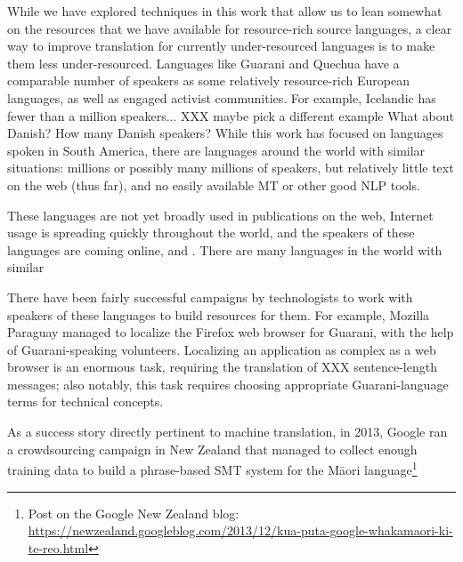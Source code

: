 While we have explored techniques in this work that allow us to lean
somewhat on the resources that we have available for resource-rich source
languages, a clear way to improve translation for currently under-resourced
languages is to make them less under-resourced. Languages like Guarani and
Quechua have a comparable number of speakers as some relatively resource-rich
European languages, as well as engaged activist communities. For example,
Icelandic has fewer than a million speakers... XXX maybe pick a different
example
What about Danish? How many Danish speakers?
While this work has focused on languages spoken in South America, there are
languages around the world with similar situations: millions or possibly many
millions of speakers, but relatively little text on the web (thus far), and no
easily available MT or other good NLP tools.

These languages are not yet broadly used in publications on the web,
Internet usage is spreading quickly throughout the world, and
the speakers of these languages are coming online, and . There are many languages in
the world with similar 

There have been fairly successful campaigns by technologists to work with
speakers of these languages to build resources for them.
For example, Mozilla Paraguay managed to localize the Firefox web browser for
Guarani, with the help of Guarani-speaking volunteers. Localizing an
application as complex as a web browser is an enormous task, requiring the
translation of XXX sentence-length messages; also notably, this task requires
choosing appropriate Guarani-language terms for technical concepts.

As a success story directly pertinent to machine translation, in 2013, Google
ran a crowdsourcing campaign in New Zealand that managed to collect
enough training data to build a phrase-based SMT system for the Māori
language\footnote{Post on the Google New Zealand blog:
\url{https://newzealand.googleblog.com/2013/12/kua-puta-google-whakamaori-ki-te-reo.html}}



